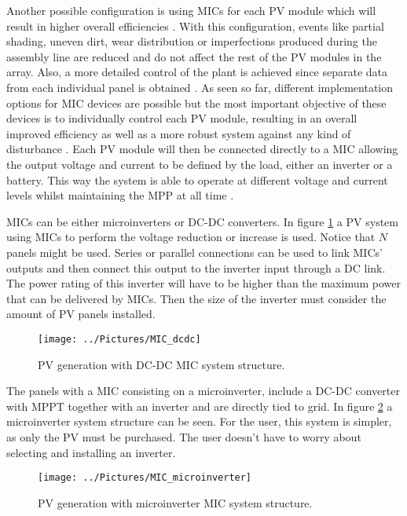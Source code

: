 \vspace{0.6cm}
Another possible configuration is using MICs for each PV module which will result in higher overall efficiencies \cite{ArchitectureMIC}. With this configuration, events like partial shading, uneven dirt, wear distribution or imperfections produced during the assembly line are reduced and do not affect the rest of the PV modules in the array. Also, a more detailed control of the plant is achieved since separate data from each individual panel is obtained \cite{ArchitectureMIC}.
As seen so far, different implementation options for MIC devices are possible but the most important objective of these devices is to individually control each PV module, resulting in an overall improved efficiency as well as a more robust system against any kind of disturbance \cite{ArchitectureMIC}. Each PV module will then be connected directly to a MIC allowing the output voltage and current to be defined by the load, either an inverter or a battery.  This way the system is able to operate at different voltage and current levels whilst maintaining the MPP at all time \cite{ArchitectureMIC}. 

MICs can be either microinverters or DC-DC converters. In figure \ref{MIC_dcdc} a PV system using MICs to perform the voltage reduction or increase is used. Notice that $N$ panels might be used. Series or parallel connections can be used to link MICs' outputs and then connect this output to the inverter input through a DC link.  The power rating of this inverter will have to be higher than the maximum power that can be delivered by MICs. Then the size of the inverter must consider the amount of PV panels installed.

\begin{figure}[H]
	\begin{center}
		\texttt{[image: ../Pictures/MIC\_dcdc]}
		\caption{PV generation with DC-DC MIC system structure.}
		\label{MIC_dcdc}
	\end{center}	
\end{figure}

The panels with a MIC consisting on a microinverter, include a DC-DC converter with MPPT together with an inverter and are directly tied to grid. In figure \ref{microinverter_system} a microinverter system structure can be seen. For the user, this system is simpler, as only the PV must be purchased. The user doesn't have to worry about selecting and installing an inverter. 

\vspace{0.6cm}
\begin{figure}[H]
	\begin{center}
		\texttt{[image: ../Pictures/MIC\_microinverter]}
		\caption{PV generation with microinverter MIC system structure.}
		\label{microinverter_system}
	\end{center}	
\end{figure}

